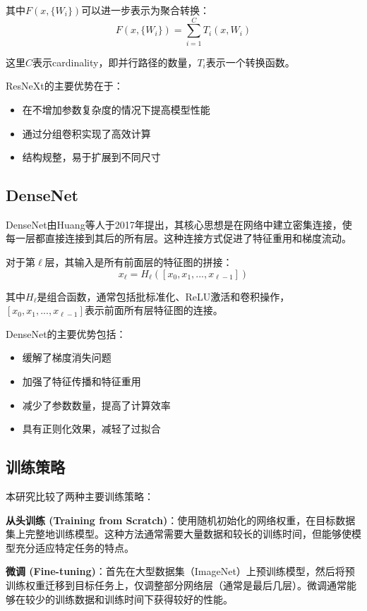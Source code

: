 \documentclass[a4paper,10pt,twocolumn]{article}
\begin{document}
其中$F(x, \{W_i\})$可以进一步表示为聚合转换：
\begin{equation}
F(x, \{W_i\}) = \sum_{i=1}^{C} T_i(x, W_i)
\end{equation}

这里$C$表示cardinality，即并行路径的数量，$T_i$表示一个转换函数。

ResNeXt的主要优势在于：
\begin{itemize}
    \item 在不增加参数复杂度的情况下提高模型性能
    \item 通过分组卷积实现了高效计算
    \item 结构规整，易于扩展到不同尺寸
\end{itemize}

\subsection{DenseNet}
DenseNet由Huang等人于2017年提出\cite{huang2017densely}，其核心思想是在网络中建立密集连接，使每一层都直接连接到其后的所有层。这种连接方式促进了特征重用和梯度流动。

对于第$\ell$层，其输入是所有前面层的特征图的拼接：
\begin{equation}
x_\ell = H_\ell([x_0, x_1, ..., x_{\ell-1}])
\end{equation}

其中$H_\ell$是组合函数，通常包括批标准化、ReLU激活和卷积操作，$[x_0, x_1, ..., x_{\ell-1}]$表示前面所有层特征图的连接。

DenseNet的主要优势包括：
\begin{itemize}
    \item 缓解了梯度消失问题
    \item 加强了特征传播和特征重用
    \item 减少了参数数量，提高了计算效率
    \item 具有正则化效果，减轻了过拟合
\end{itemize}

\subsection{训练策略}
本研究比较了两种主要训练策略：

\textbf{从头训练 (Training from Scratch)}：使用随机初始化的网络权重，在目标数据集上完整地训练模型。这种方法通常需要大量数据和较长的训练时间，但能够使模型充分适应特定任务的特点。

\textbf{微调 (Fine-tuning)}：首先在大型数据集（ImageNet）上预训练模型，然后将预训练权重迁移到目标任务上，仅调整部分网络层（通常是最后几层）。微调通常能够在较少的训练数据和训练时间下获得较好的性能。
\end{document}
